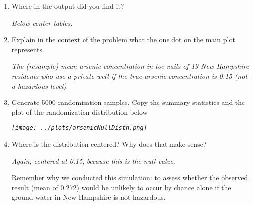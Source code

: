 \begin{enumerate}
\begin{key}
  {\it AWV}
\end{key}

\item Where in the  output did you find it?
\begin{students}
  \vspace{1cm}
\end{students}

\begin{key}
  {\it Below center tables.}
\end{key}


\item Explain in the context of the problem what the one dot on the
  main plot represents. 
\begin{students}
  \vspace{1cm}
\end{students}

\begin{key}
  {\it The (resample) mean arsenic concentration in toe nails of 19
    New Hampshire residents who use a private well if the true arsenic
    concentration is 0.15 (not a hazardous level) }
\end{key}
\item Generate 5000 randomization samples.  Copy the summary statistics and
the plot of the randomization distribution below
\begin{students}
  \vspace{4cm}
\end{students}

\begin{key}
  {\it \texttt{[image: ../plots/arsenicNullDistn.png]}}
\end{key}


\item 
 Where is the distribution centered?  Why does that make sense?
\begin{students}
  \vspace{1cm}
\end{students}

\begin{key}
  {\it Again, centered at 0.15, because this is the null value. }
\end{key}

Remember why we conducted this simulation: to assess whether the
observed result (mean of 0.272) would be unlikely to occur by chance
alone if the ground water in New Hampshire is not hazardous. 


\end{enumerate}
